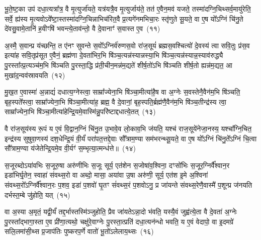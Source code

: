 {\anuvakamend[{अ॒मृत॑मस्मै जायते॒ यस्यै॒ता उ॑पधी॒यन्ते॒ य उ॑ प॒र्जन्य॑ उप॒दधा॑ति सा॒क्षाथ्स॒प्तच॑त्वारिꣳशच्च}]}%

भू॒ते॒ष्ट॒का उप॑ दधा॒त्यत्रा᳚त्र॒ वै मृ॒त्युर्जा॑यते॒ यत्र॑यत्रै॒व मृ॒त्युर्जाय॑ते॒ तत॑ ए॒वैन॒मव॑ यजते॒ तस्मा॑दग्नि॒चिथ्सर्व॒मायु॑रेति॒ सर्वे॒ ह्य॑स्य मृ॒त्यवो\-ऽवे᳚ष्टा॒स्तस्मा॑दग्नि॒चिन्नाभिच॑रित॒वै प्र॒त्यगे॑नमभिचा॒रः स्तृ॑णुते सू॒यते॒ वा ए॒ष यो᳚\-ऽग्निं चि॑नु॒ते दे॑वसु॒वामे॒तानि॑ ह॒वीꣳषि॑ भवन्त्ये॒ताव॑न्तो॒ वै दे॒वानाꣳ॑ स॒वास्त ए॒व~(११)

अ॒स्मै॒ स॒वान्प्र य॑च्छन्ति॒ त ए॑नꣳ सुवन्ते स॒वो᳚\-ऽग्निर्व॑रुणस॒वो रा॑ज॒सूयं॑ ब्रह्मस॒वश्चित्यो॑ दे॒वस्य॑ त्वा सवि॒तुः प्र॑स॒व इत्या॑ह सवि॒तृप्र॑सूत ए॒वैनं॒ ब्रह्म॑णा दे॒वता॑भिर॒भि षि॑ञ्च॒त्यन्न॑स्यान्नस्या॒भि षि॑ञ्च॒त्यन्न॑स्यान्न॒स्याव॑रुद्ध्यै पु॒रस्ता᳚त्प्र॒त्यञ्च॑म॒भि षि॑ञ्चति पु॒रस्ता॒द्धि प्र॑ती॒चीन॒मन्न॑म॒द्यते॑ शीर्\mbox{}ष॒तो॑\-ऽभि षि॑ञ्चति शीर्\mbox{}ष॒तो ह्यन्न॑म॒द्यत॒ आ मुखा॑द॒न्वव॑स्रावयति~(१२)

मु॒ख॒त ए॒वास्मा॑ अ॒न्नाद्यं॑ दधात्य॒ग्नेस्त्वा॒ साम्रा᳚ज्येना॒भि षि॑ञ्चा॒मीत्या॑है॒ष वा अ॒ग्नेः स॒वस्तेनै॒वैन॑म॒भि षि॑ञ्चति॒ बृह॒स्पते᳚स्त्वा॒ साम्रा᳚ज्येना॒भि षि॑ञ्चा॒मीत्या॑ह॒ ब्रह्म॒ वै दे॒वानां॒ बृह॒स्पति॒र्ब्रह्म॑णै॒वैन॑म॒भि षि॑ञ्च॒तीन्द्र॑स्य त्वा॒ साम्रा᳚ज्येना॒भि षि॑ञ्चा॒मीत्या॑हेन्द्रि॒यमे॒वास्मि॑न्नु॒परि॑ष्टाद्दधात्ये॒तत्~(१३)

वै रा॑ज॒सूय॑स्य रू॒पं य ए॒वं वि॒द्वान॒ग्निं चि॑नु॒त उ॒भावे॒व लो॒काव॒भि ज॑यति॒ यश्च॑ राज॒सूये॑नेजा॒नस्य॒ यश्चा᳚ग्नि॒चित॒ इन्द्र॑स्य सुषुवा॒णस्य॑ दश॒धेन्द्रि॒यं वी॒र्यं॑ परा॑पत॒त्तद्दे॒वाः सौ᳚त्राम॒ण्या सम॑भरन्थ्सू॒यते॒ वा ए॒ष यो᳚\-ऽग्निं चि॑नु॒ते᳚\-ऽग्निं चि॒त्वा सौ᳚त्राम॒ण्या य॑जेतेन्द्रि॒यमे॒व वी॒र्यꣳ॑ स॒म्भृत्या॒त्मन्ध॑त्ते॥~(१४)

{}%

स॒जूरब्दो\-ऽया॑वभिः स॒जूरु॒षा अरु॑णीभिः स॒जूः सूर्य॒ एत॑शेन स॒जोषा॑व॒श्विना॒ दꣳसो॑भिः स॒जूर॒ग्निर्वै᳚श्वान॒र इडा॑भिर्घृ॒तेन॒ स्वाहा॑ संवथ्स॒रो वा अब्दो॒ मासा॒ अया॑वा उ॒षा अरु॑णी॒ सूर्य॒ एत॑श इ॒मे अ॒श्विना॑ संवथ्स॒रो᳚\-ऽग्निर्वै᳚श्वान॒रः प॒शव॒ इडा॑ प॒शवो॑ घृ॒तꣳ सं॑वथ्स॒रं प॒शवो\-ऽनु॒ प्र जा॑यन्ते संवथ्स॒रेणै॒वास्मै॑ प॒शून्प्र ज॑नयति दर्भस्त॒म्बे जु॑होति॒ यत्~(१५)

वा अ॒स्या अ॒मृतं॒ यद्वी॒र्यं॑ तद्द॒र्भास्तस्मि॑ञ्जुहोति॒ प्रैव जा॑यते\-ऽन्ना॒दो भ॑वति॒ यस्यै॒वं जुह्व॑त्ये॒ता वै दे॒वता॑ अ॒ग्नेः पु॒रस्ता᳚द्भागा॒स्ता ए॒व प्री॑णा॒त्यथो॒ चक्षु॑रे॒वाग्नेः पु॒रस्ता॒त्प्रति॑ दधा॒त्यन॑न्धो भवति॒ य ए॒वं वेदापो॒ वा इ॒दमग्रे॑ सलि॒लमा॑सी॒थ्स प्र॒जा\-प॑तिः पुष्करप॒र्णे वातो॑ भू॒तो॑\-ऽलेलाय॒थ्सः~(१६)

